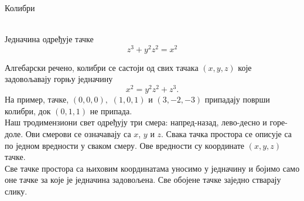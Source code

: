 \documentclass[sr]{./../../common/SurferDesc}%
\begin{document}
\footnotesize

\begin{surferPage}
  \begin{surferTitle}Колибри\end{surferTitle}   \\
Једначина одређује тачке\\
  
  \smallskip
\[z^3+ y^2	z^2	= x^2\]

\singlespacing
Алгебарски речено, колибри се састоји од свих тачака  $(x, y, z)$ које задовољавају горњу једначину
\smallskip
\[ x^2= y^2z^2+z^3.\]
\smallskip
На пример, тачке, $(0,0,0),$ $(1,0,1)$ и $(3,-2,-3)$ припадају површи колибри, док $(0,1,1)$ не припада.\\
 \singlespacing
 Наш тродимензиони свет одређују три смера: напред-назад, лево-десно и горе-доле. Ови смерови се означавају са $x$, $y$ и $z$. Свака тачка простора се описује са по једном вредности у сваком смеру. Ове вредности су координате $(x,y,z)$ тачке.\\
\singlespacing
Све тачке простора са њиховим координатама  уносимо у једначину и бојимо само оне тачке за које је једначина задовољена. Све обојене тачке заједно стварају слику.\\
\singlespacing


  \begin{surferText}
     \end{surferText}
\end{surferPage}
\end{document}
